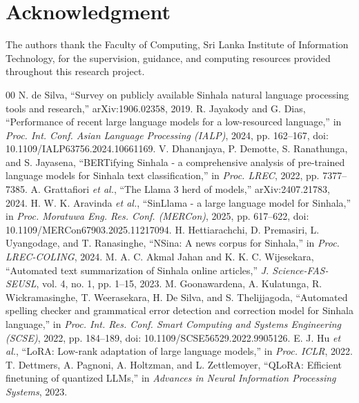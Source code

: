 \documentclass[a4paper,conference]{IEEEtran}
\newif\ificacblind
\begin{document}
\ificacblind
\else
\section*{Acknowledgment}
The authors thank the Faculty of Computing, Sri Lanka Institute of Information
Technology, for the supervision, guidance, and computing resources provided
throughout this research project.
\fi

\begin{thebibliography}{00}
 N. de Silva, ``Survey on publicly available Sinhala natural language processing tools and research,'' arXiv:1906.02358, 2019.
 R. Jayakody and G. Dias, ``Performance of recent large language models for a low-resourced language,'' in \textit{Proc. Int. Conf. Asian Language Processing (IALP)}, 2024, pp. 162--167, doi: 10.1109/IALP63756.2024.10661169.
 V. Dhananjaya, P. Demotte, S. Ranathunga, and S. Jayasena, ``BERTifying Sinhala - a comprehensive analysis of pre-trained language models for Sinhala text classification,'' in \textit{Proc. LREC}, 2022, pp. 7377--7385.
 A. Grattafiori \textit{et al.}, ``The Llama 3 herd of models,'' arXiv:2407.21783, 2024.
 H. W. K. Aravinda \textit{et al.}, ``SinLlama - a large language model for Sinhala,'' in \textit{Proc. Moratuwa Eng. Res. Conf. (MERCon)}, 2025, pp. 617--622, doi: 10.1109/MERCon67903.2025.11217094.
 H. Hettiarachchi, D. Premasiri, L. Uyangodage, and T. Ranasinghe, ``NSina: A news corpus for Sinhala,'' in \textit{Proc. LREC-COLING}, 2024.
 M. A. C. Akmal Jahan and K. K. C. Wijesekara, ``Automated text summarization of Sinhala online articles,'' \textit{J. Science-FAS-SEUSL}, vol. 4, no. 1, pp. 1--15, 2023.
 M. Goonawardena, A. Kulatunga, R. Wickramasinghe, T. Weerasekara, H. De Silva, and S. Thelijjagoda, ``Automated spelling checker and grammatical error detection and correction model for Sinhala language,'' in \textit{Proc. Int. Res. Conf. Smart Computing and Systems Engineering (SCSE)}, 2022, pp. 184--189, doi: 10.1109/SCSE56529.2022.9905126.
 E. J. Hu \textit{et al.}, ``LoRA: Low-rank adaptation of large language models,'' in \textit{Proc. ICLR}, 2022.
 T. Dettmers, A. Pagnoni, A. Holtzman, and L. Zettlemoyer, ``QLoRA: Efficient finetuning of quantized LLMs,'' in \textit{Advances in Neural Information Processing Systems}, 2023.

\end{thebibliography}
\end{document}
